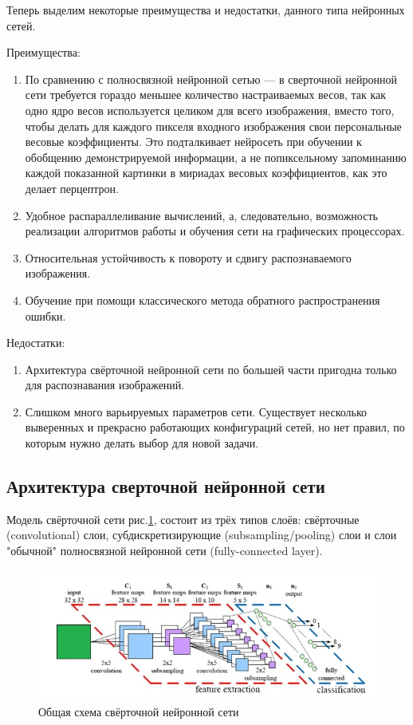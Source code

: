 \documentclass[14pt]{article}
\numberwithin{figure}{section}
\numberwithin{equation}{section}
\begin{document}
Теперь выделим некоторые преимущества и недостатки, данного типа нейронных сетей.

Преимущества:
\begin{enumerate}
	\item
	По сравнению с полносвязной нейронной сетью — в сверточной нейронной сети требуется гораздо меньшее количество настраиваемых весов, так как одно ядро весов используется целиком для всего изображения, вместо того, чтобы делать для каждого пикселя входного изображения свои персональные весовые коэффициенты. Это подталкивает нейросеть при обучении к обобщению демонстрируемой информации, а не попиксельному запоминанию каждой показанной картинки в мириадах весовых коэффициентов, как это делает перцептрон.
	\item
	Удобное распараллеливание вычислений, а, следовательно, возможность реализации алгоритмов работы и обучения сети на графических процессорах.
	\item
	Относительная устойчивость к повороту и сдвигу распознаваемого изображения.
	\item
	Обучение при помощи классического метода обратного распространения ошибки.
\end{enumerate}

Недостатки:
\begin{enumerate}
	\item
	Архитектура свёрточной нейронной сети по большей части пригодна только для распознавания изображений.
	\item
	Слишком много варьируемых параметров сети. Существует несколько выверенных и прекрасно работающих конфигураций сетей, но нет правил, по которым нужно делать выбор для новой задачи.
\end{enumerate}

\subsection{Архитектура сверточной нейронной сети}

Модель свёрточной сети рис.\ref{ris:6}, состоит из трёх типов слоёв: свёрточные \\ (convolutional) слои, субдискретизирующие (subsampling/pooling) слои и слои "обычной" полносвязной нейронной сети (fully-connected layer).

\begin{figure}[h]
	\begin{center}
		\includegraphics[scale=0.99] {6.JPG}
		\caption{Общая схема свёрточной нейронной сети}
		\label{ris:6}
	\end{center}
\end{figure}
\end{document}
